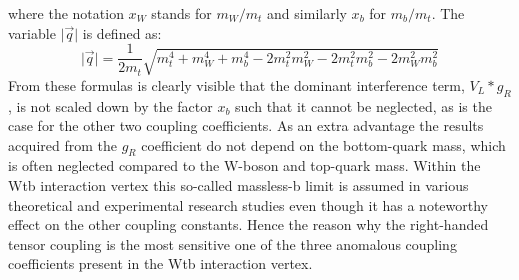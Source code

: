 where the notation $x_W$ stands for $m_W/m_t$ and similarly $x_b$ for $m_b/m_t$.
The variable $\vert \vec{q} \vert$ is defined as:
\begin{equation}
 \vert \vec{q} \vert = \frac{1}{2 m_{t}} \sqrt{m_{t}^{4} + m_{W}^{4} + m_{b}^{4} - 2m_{t}^{2} m_{W}^{2} - 2m_{t}^{2} m_{b}^{2} - 2m_{W}^{2}m_{b}^{2}}
\end{equation}
From these formulas is clearly visible that the dominant interference term, $V_L * g_R$, is not scaled down by the factor $x_b$ such that it cannot be neglected, as is the case for the other two coupling coefficients. As an extra advantage the results acquired from the $g_R$ coefficient do not depend on the bottom-quark mass, which is often neglected compared to the W-boson and top-quark mass. Within the Wtb interaction vertex this so-called massless-b limit is assumed in various theoretical and experimental research studies even though it has a noteworthy effect on the other coupling constants. Hence the reason why the right-handed tensor coupling is the most sensitive one of the three anomalous coupling coefficients present in the Wtb interaction vertex.
\\

%

